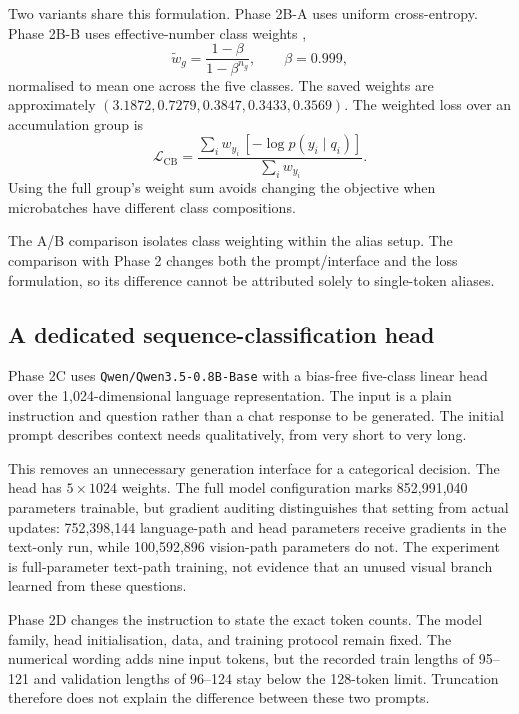 Two variants share this formulation. Phase 2B-A uses uniform
cross-entropy. Phase 2B-B uses effective-number class weights
\cite{cui2019classbalanced},
\begin{equation}
\tilde w_g=\frac{1-\beta}{1-\beta^{n_g}},\qquad \beta=0.999,
\end{equation}
normalised to mean one across the five classes. The saved weights are
approximately $(3.1872,0.7279,0.3847,0.3433,0.3569)$.
The weighted loss over an accumulation group is
\begin{equation}
\mathcal{L}_{\mathrm{CB}}=
\frac{\sum_i w_{y_i}\,[-\log p(y_i\mid q_i)]}
{\sum_i w_{y_i}}.
\label{eq:cbloss}
\end{equation}
Using the full group's weight sum avoids changing the objective when
microbatches have different class compositions.

The A/B comparison isolates class weighting within the alias setup.
The comparison with Phase 2 changes both the prompt/interface and the
loss formulation, so its difference cannot be attributed solely to
single-token aliases.

\subsection{A dedicated sequence-classification head}
Phase 2C uses \texttt{Qwen/Qwen3.5-0.8B-Base}
\cite{qwen2026base} with a bias-free five-class linear head over the
1,024-dimensional language representation. The input is a plain
instruction and question rather than a chat response to be generated.
The initial prompt describes context needs qualitatively, from very
short to very long.

This removes an unnecessary generation interface for a categorical
decision. The head has $5\times1024$ weights. The full model configuration
marks 852,991,040 parameters trainable, but gradient auditing distinguishes
that setting from actual updates: 752,398,144 language-path and head
parameters receive gradients in the text-only run, while 100,592,896
vision-path parameters do not. The experiment is full-parameter
text-path training, not evidence that an unused visual branch learned
from these questions.

Phase 2D changes the instruction to state the exact token counts.
The model family, head initialisation, data, and training protocol
remain fixed. The numerical wording adds nine input tokens, but the
recorded train lengths of 95--121 and validation lengths of 96--124
stay below the 128-token limit. Truncation therefore does not explain
the difference between these two prompts.

